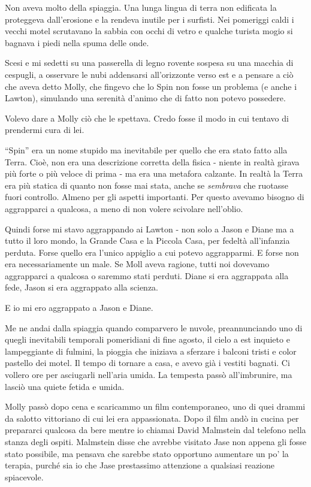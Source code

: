 Non aveva molto della spiaggia. Una lunga lingua di terra non edificata
la proteggeva dall'erosione e la rendeva inutile per i surfisti. Nei
pomeriggi caldi i vecchi motel scrutavano la sabbia con occhi di vetro e
qualche turista mogio si bagnava i piedi nella spuma delle onde.

Scesi e mi sedetti su una passerella di legno rovente sospesa su una
macchia di cespugli, a osservare le nubi addensarsi all'orizzonte verso
est e a pensare a ciò che aveva detto Molly, che fingevo che lo Spin non
fosse un problema (e anche i Lawton), simulando una serenità d'animo che
di fatto non potevo possedere.

Volevo dare a Molly ciò che le spettava. Credo fosse il modo in cui
tentavo di prendermi cura di lei.

``Spin'' era un nome stupido ma inevitabile per quello che era stato
fatto alla Terra. Cioè, non era una descrizione corretta della fisica -
niente in realtà girava più forte o più veloce di prima - ma era una
metafora calzante. In realtà la Terra era più statica di quanto non
fosse mai stata, anche se \emph{sembrava} che ruotasse fuori controllo.
Almeno per gli aspetti importanti. Per questo avevamo bisogno di
aggrapparci a qualcosa, a meno di non volere scivolare nell'oblio.

Quindi forse mi stavo aggrappando ai Lawton - non solo a Jason e Diane
ma a tutto il loro mondo, la Grande Casa e la Piccola Casa, per fedeltà
all'infanzia perduta. Forse quello era l'unico appiglio a cui potevo
aggrapparmi. E forse non era necessariamente un male. Se Moll aveva
ragione, tutti noi dovevamo aggrapparci a qualcosa o saremmo stati
perduti. Diane si era aggrappata alla fede, Jason si era aggrappato alla
scienza.

E io mi ero aggrappato a Jason e Diane.

Me ne andai dalla spiaggia quando comparvero le nuvole, preannunciando
uno di quegli inevitabili temporali pomeridiani di fine agosto, il cielo
a est inquieto e lampeggiante di fulmini, la pioggia che iniziava a
sferzare i balconi tristi e color pastello dei motel. Il tempo di
tornare a casa, e avevo già i vestiti bagnati. Ci vollero ore per
asciugarli nell'aria umida. La tempesta passò all'imbrunire, ma lasciò
una quiete fetida e umida.

Molly passò dopo cena e scaricammo un film contemporaneo, uno di quei
drammi da salotto vittoriano di cui lei era appassionata. Dopo il film
andò in cucina per prepararci qualcosa da bere mentre io chiamai David
Malmstein dal telefono nella stanza degli ospiti. Malmstein disse che
avrebbe visitato Jase non appena gli fosse stato possibile, ma pensava
che sarebbe stato opportuno aumentare un po' la terapia, purché sia io
che Jase prestassimo attenzione a qualsiasi reazione spiacevole.

